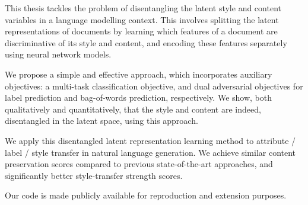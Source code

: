 This thesis tackles the problem of disentangling the latent style and content variables in a language modelling context. This involves splitting the latent representations of documents by learning which features of a document are discriminative of its style and content, and encoding these features separately using neural network models.

We propose a simple and effective approach, which incorporates auxiliary objectives: a multi-task classification objective, and dual adversarial objectives for label prediction and bag-of-words prediction, respectively. We show, both qualitatively and quantitatively, that the style and content are indeed, disentangled in the latent space, using this approach.

We apply this disentangled latent representation learning method to attribute / label / style transfer in natural language generation. We achieve similar content preservation scores compared to previous state-of-the-art approaches, and significantly better style-transfer strength scores.

Our code is made publicly available for reproduction and extension purposes.
